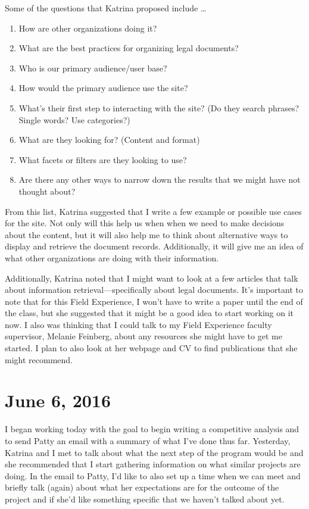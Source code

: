 \documentclass{article}
\begin{document}
Some of the questions that Katrina proposed include \dots

\begin{enumerate}
\itemsep0em 
    \item How are other organizations doing it?
    \item What are the best practices for organizing legal documents?
    \item Who is our primary audience/user base?
    \item How would the primary audience use the site?
    \item What's their first step to interacting with the site? (Do they search phrases? Single words? Use categories?)
    \item What are they looking for? (Content and format)
    \item What facets or filters are they looking to use?
    \item Are there any other ways to narrow down the results that we might have not thought about?
\end{enumerate}

\noindent From this list, Katrina suggested that I write a few example or possible use cases for the site. Not only will this help us when when we need to make decisions about the content, but it will also help me to think about alternative ways to display and retrieve the document records. Additionally, it will give me an idea of what other organizations are doing with their information.

Additionally, Katrina noted that I might want to look at a few articles that talk about information retrieval---specifically about legal documents. It's important to note that for this Field Experience, I won't have to write a paper until the end of the class, but she suggested that it might be a good idea to start working on it now. I also was thinking that I could talk to my Field Experience faculty supervisor, Melanie Feinberg, about any resources she might have to get me started. I plan to also look at her webpage and CV to find publications that she might recommend.

\section{June 6, 2016}
I began working today with the goal to begin writing a competitive analysis and to send Patty an email with a summary of what I've done thus far. Yesterday, Katrina and I met to talk about what the next step of the program would be and she recommended that I start gathering information on what similar projects are doing. In the email to Patty, I'd like to also set up a time when we can meet and briefly talk (again) about what her expectations are for the outcome of the project and if she'd like something specific that we haven't talked about yet. 
\end{document}

